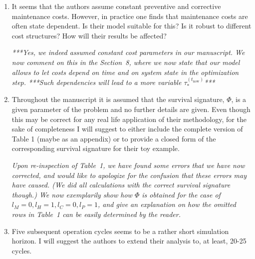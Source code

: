 \documentclass[authoryear]{elsarticle}
\def\tnow{t_\text{now}}
\newcommand{\tausnow}{\tau_*^{(\tnow)}}
\begin{document}
\begin{enumerate}
\item It seems that the authors assume constant preventive and corrective maintenance costs. However, in practice one finds that maintenance costs are often state dependent. Is their model suitable for this? Is it robust to different cost structures? How will their results be affected?

\smallskip

\emph{***Yes, we indeed assumed constant cost parameters in our manuscript.
We now comment on this in the Section~8, where we now state that our model allows
to let costs depend on time and on system state in the optimization step.
***Such dependencies will lead to a more variable $\tausnow$***
}

\item Throughout the manuscript it is assumed that the survival signature, $\Phi$, is a given parameter of the problem and no further details are given. Even though this may be correct for any real life application of their methodology, for the sake of completeness I will suggest to either include the complete version of Table 1 (maybe as an appendix) or to provide a closed form of the corresponding survival signature for their toy example.

\smallskip

\emph{Upon re-inspection of Table~1, we have found some errors that we have now corrected,
and would like to apologize for the confusion that these errors may have caused.
(We did all calculations with the correct survival signature though.)
We now exemplarily show how $\Phi$ is obtained for the case of $l_M = 0, l_H = 1, l_C = 0, l_P = 1$,
and give an explanation on how the omitted rows in Table~1 can be easily determined by the reader.}

\item Five subsequent operation cycles seems to be a rather short simulation horizon. I will suggest the authors to extend their analysis to, at least, 20-25 cycles.


\end{enumerate}
\end{document}
